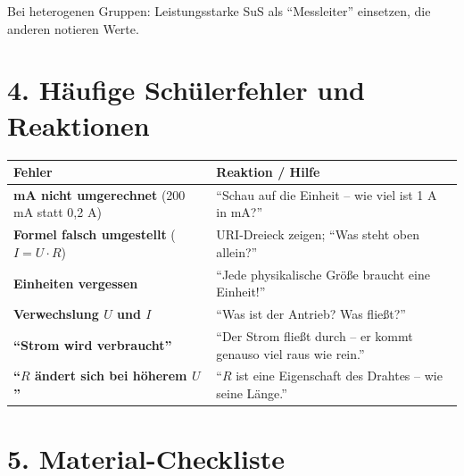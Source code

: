 \documentclass[11pt, a4paper]{article}
\begin{document}
\vspace{1em}

\begin{tippbox}
Bei heterogenen Gruppen: Leistungsstarke SuS als ``Messleiter'' einsetzen, die anderen notieren Werte.
\end{tippbox}


\section*{4. Häufige Schülerfehler und Reaktionen}

\begin{warnbox}
\begin{tabular}{|p{5cm}|p{8cm}|}
\hline
\textbf{Fehler} & \textbf{Reaktion / Hilfe} \\
\hline
\textbf{mA nicht umgerechnet} (200 mA statt 0,2 A) & ``Schau auf die Einheit -- wie viel ist 1 A in mA?'' \\
\hline
\textbf{Formel falsch umgestellt} ($I = U \cdot R$) & URI-Dreieck zeigen; ``Was steht oben allein?'' \\
\hline
\textbf{Einheiten vergessen} & ``Jede physikalische Größe braucht eine Einheit!'' \\
\hline
\textbf{Verwechslung $U$ und $I$} & ``Was ist der Antrieb? Was fließt?'' \\
\hline
\textbf{``Strom wird verbraucht''} & ``Der Strom fließt durch -- er kommt genauso viel raus wie rein.'' \\
\hline
\textbf{``$R$ ändert sich bei höherem $U$''} & ``$R$ ist eine Eigenschaft des Drahtes -- wie seine Länge.'' \\
\hline
\end{tabular}
\end{warnbox}


\section*{5. Material-Checkliste}
\end{document}
